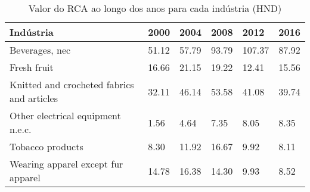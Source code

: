 \begin{table}
\centering
\caption{Valor do RCA ao longo dos anos para cada indústria (HND)}
\begin{tabular}{p{6cm}p{1.5cm}p{1.5cm}p{1.5cm}p{1.5cm}p{1.5cm}}
\toprule
                                 Indústria &  2000 &  2004 &  2008 &   2012 &  2016 \\
\midrule
                            Beverages, nec & 51.12 & 57.79 & 93.79 & 107.37 & 87.92 \\
                               Fresh fruit & 16.66 & 21.15 & 19.22 &  12.41 & 15.56 \\
Knitted and crocheted fabrics and articles & 32.11 & 46.14 & 53.58 &  41.08 & 39.74 \\
         Other electrical equipment n.e.c. &  1.56 &  4.64 &  7.35 &   8.05 &  8.35 \\
                          Tobacco products &  8.30 & 11.92 & 16.67 &   9.92 &  8.11 \\
        Wearing apparel except fur apparel & 14.78 & 16.38 & 14.30 &   9.93 &  8.52 \\
\bottomrule
\end{tabular}
\end{table}
